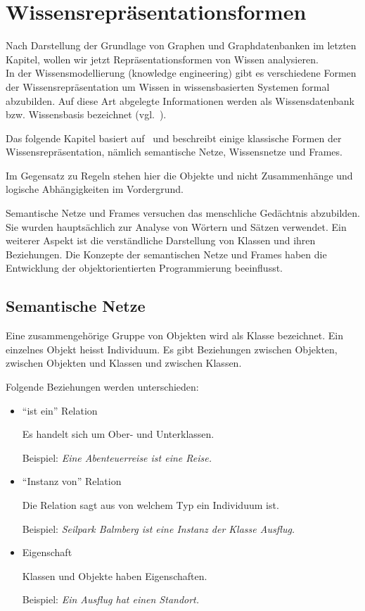 \chapter{Wissensrepräsentationsformen}
\label{chap:wissensrepFormen}

Nach Darstellung der Grundlage von Graphen und Graphdatenbanken im letzten Kapitel, wollen wir jetzt Repräsentationsformen von Wissen analysieren.\\
In der Wissensmodellierung (knowledge engineering) gibt es verschiedene Formen der Wissensrepräsentation um Wissen in wissensbasierten Systemen formal abzubilden. Auf diese Art abgelegte Informationen werden als Wissensdatenbank bzw. Wissensbasis bezeichnet (vgl.~\cite{wikiWissensrep}).

Das folgende Kapitel basiert auf~\cite[S. 85 - 90]{laemmel} und beschreibt einige klassische Formen der Wissensrepräsentation, nämlich semantische Netze, Wissensnetze und Frames.

Im Gegensatz zu Regeln stehen hier die Objekte und nicht Zusammenhänge und logische Abhängigkeiten im Vordergrund.

Semantische Netze und Frames versuchen das menschliche Gedächtnis abzubilden. Sie wurden hauptsächlich zur Analyse von Wörtern und Sätzen verwendet. Ein weiterer Aspekt ist die verständliche Darstellung von Klassen und ihren Beziehungen. Die Konzepte der semantischen Netze und Frames haben die Entwicklung der objektorientierten Programmierung beeinflusst.

\section{Semantische Netze}
\label{sec:wissensrepFormen_semantischeNetze}

Eine zusammengehörige Gruppe von Objekten wird als Klasse bezeichnet. Ein einzelnes Objekt heisst Individuum. Es gibt Beziehungen zwischen Objekten, zwischen Objekten und Klassen und zwischen Klassen.

Folgende Beziehungen werden unterschieden:
\begin{itemize}
    \item ``ist ein'' Relation

        Es handelt sich um Ober- und Unterklassen.

        Beispiel: \textit{Eine Abenteuerreise ist eine Reise.}

    \item ``Instanz von'' Relation

        Die Relation sagt aus von welchem Typ ein Individuum ist.

        Beispiel: \textit{Seilpark Balmberg ist eine Instanz der Klasse Ausflug.}

    \item Eigenschaft

        Klassen und Objekte haben Eigenschaften.

        Beispiel: \textit{Ein Ausflug hat einen Standort.}
\end{itemize}

